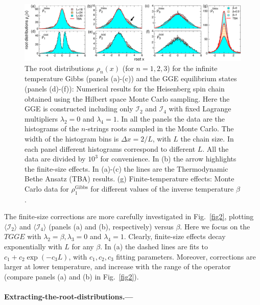 \documentclass[twocolumn,superscriptaddress,prb,10pt]{revtex4-1}
\begin{document}
\begin{figure}[t]
\includegraphics*[width=0.99\linewidth]{./draft_figs/fig2}
\caption{The root distributions $\rho_n(x)$ (for $n=1,2,3$) for the infinite temperature 
 Gibbs (panels (a)-(c)) and the GGE equilibrium states (panels (d)-(f)): Numerical  
 results for the Heisenberg spin chain obtained using the Hilbert space Monte Carlo 
 sampling. Here the GGE is constructed including only ${\mathcal I}_2$ and ${\mathcal I}_4$ 
 with fixed Lagrange multipliers $\lambda_2=0$ and $\lambda_4=1$. In all the panels the 
 data are the histograms of the $n$-strings roots sampled in the Monte Carlo.
 The width of the histogram bins is $\Delta x=2/L$, with $L$ the chain size. 
 In each panel different histograms correspond to different $L$. All the data are divided 
 by $10^3$ for convenience. In (b) the arrow highlights the finite-size effects. In 
 (a)-(c) the lines are the Thermodynamic Bethe Ansatz (TBA) results. (g) Finite-temperature 
 effects: Monte Carlo data for $\rho^{\textrm{Gibbs}}_1$ for different values of the 
 inverse temperature $\beta$.
}
\label{fig3}
\end{figure}


The finite-size corrections are more carefully investigated in Fig.~\ref{fig2},   
plotting $\langle{\mathcal I}_2\rangle$ and $\langle {\mathcal I}_4
\rangle$ (panels (a) and (b), respectively) versus $\beta$. Here we focus on 
the $TGGE$ with $\lambda_2=\beta,\lambda_3=0$ and $\lambda_4=1$. Clearly,  
finite-size effects decay exponentially with $L$ for any $\beta$. In (a) the dashed 
lines are fits to $c_1+c_2\exp(-c_3L)$, with $c_1,c_2,c_3$ fitting parameters. Moreover, 
corrections are larger at lower temperature, and increase with the range of the 
operator (compare panels  (a) and (b) in Fig.~\ref{fig2}). 

\paragraph*{Extracting-the-root-distributions.---}
\end{document}
